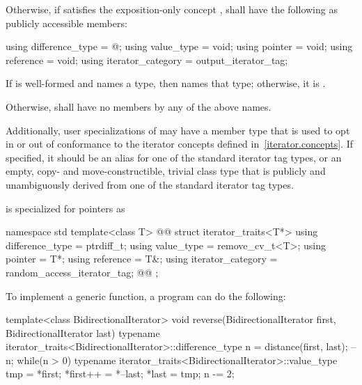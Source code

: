 \begin{itemize}
{\item
Otherwise, if  satisfies the exposition-only concept
,  shall
have the following as publicly accessible members:
\begin{codeblock}
  using difference_type   = @\seebelownc@;
  using value_type        = void;
  using pointer           = void;
  using reference         = void;
  using iterator_category = output_iterator_tag;
\end{codeblock}
If  is well-formed
and names a type, then  names that type; otherwise, it is
.
} %

\item
Otherwise, 
shall have no members by any of the above names.
\end{itemize}

{\color{newclr}
\pnum
Additionally, user specializations of  may have a member
type  that is used to opt in or out of conformance to the
iterator concepts defined in~\ref{iterator.concepts}. If specified, it should be
an alias for one of the standard iterator tag types,
or an empty, copy- and move-constructible, trivial class type that is publicly
and unambiguously derived from one of the standard iterator tag types.
} %

\pnum
{} is specialized for pointers as

\begin{codeblock}
namespace std {
  template<class T>
  @@
  struct iterator_traits<T*> {
    using difference_type   = ptrdiff_t;
    using value_type        = remove_cv_t<T>;
    using pointer           = T*;
    using reference         = T&;
    using iterator_category = random_access_iterator_tag;
    @\newtxt{ }\newtxt{ }@
  };
}
\end{codeblock}

\pnum
\begin{example}
To implement a generic
function, a \Cpp{} program can do the following:

\begin{codeblock}
template<class BidirectionalIterator>
void reverse(BidirectionalIterator first, BidirectionalIterator last) {
  typename iterator_traits<BidirectionalIterator>::difference_type n =
    distance(first, last);
  --n;
  while(n > 0) {
    typename iterator_traits<BidirectionalIterator>::value_type
     tmp = *first;
    *first++ = *--last;
    *last = tmp;
    n -= 2;
  }
}
\end{codeblock}
\end{example}

